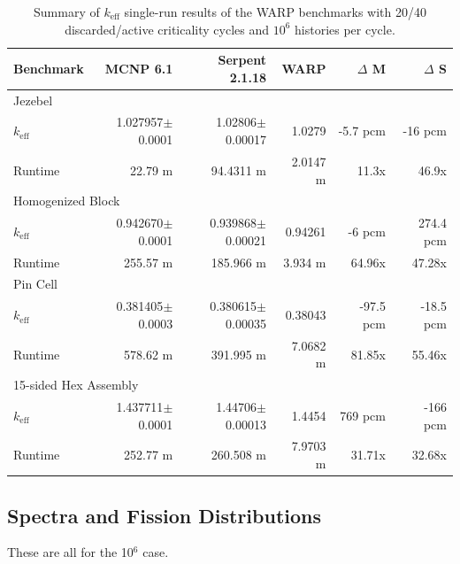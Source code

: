 \begin{table}[h]
\centering
\caption{Summary of $k_\mathrm{eff}$ single-run results of the WARP benchmarks with 20/40 discarded/active criticality cycles and $10^6$ histories per cycle.}
\label{benchmark_summary}
\begin{tabular}{| l | r | r | r | r | r |}
 \hline
 Benchmark & MCNP 6.1 & Serpent 2.1.18 & WARP & $\Delta$ M & $\Delta$ S  \\
\hline
\hline
\multicolumn{6}{|l|}{Jezebel}  \\
\hline
 $k_\mathrm{eff}$ & 1.027957$\pm$0.0001 & 1.02806$\pm$0.00017 & 1.0279 & -5.7 pcm & -16 pcm   \\
 \hline
 Runtime               & 22.79 m & 94.4311 m &  2.0147 m & 11.3x  & 46.9x  \\
 \hline
 \hline
\multicolumn{6}{|l|}{Homogenized Block }\\
\hline
 $k_\mathrm{eff}$ & 0.942670$\pm$0.0001 & 0.939868$\pm$0.00021 & 0.94261 & -6 pcm &  274.4 pcm  \\
 \hline
 Runtime               & 255.57 m & 185.966 m & 3.934 m & 64.96x & 47.28x  \\
 \hline
  \hline
\multicolumn{6}{|l|}{Pin Cell}\\
\hline
 $k_\mathrm{eff}$ & 0.381405$\pm$0.0003 & 0.380615$\pm$0.00035 & 0.38043 & -97.5 pcm &  -18.5 pcm  \\
 \hline
 Runtime               & 578.62 m & 391.995 m & 7.0682 m & 81.85x & 55.46x \\
 \hline
  \hline
\multicolumn{6}{|l|}{15-sided Hex Assembly}\\
\hline
 $k_\mathrm{eff}$ & 1.437711$\pm$0.0001 & 1.44706$\pm$0.00013 & 1.4454 & 769 pcm &  -166 pcm  \\
 \hline
 Runtime               & 252.77 m & 260.508 m & 7.9703 m & 31.71x & 32.68x \\
 \hline
\end{tabular}
\end{table}

\subsection{Spectra and Fission Distributions}

These are all for the 10$^6$ case.

